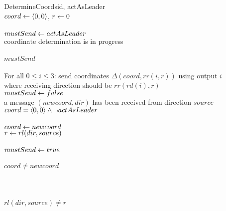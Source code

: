 \begin{myalgo}{DetermineCoords}{id, actAsLeader}
  \\
 $coord  \mathrel{\leftarrow} \langle 0,0 \rangle$, $r \mathrel{\leftarrow} 0$ \\
  \\
 $mustSend \mathrel{\leftarrow} actAsLeader$ \\
 \qwhile coordinate determination is in progress \label{sp2:loop} \\
 \qdo {} \\
       \qif $mustSend$ \label{sp2:send1} \\
       \qthen {} \\
              For all $0 \leq i \leq 3$: send coordinates $\Delta(coord, rr(i, r))$ using output $i$ \\
              where receiving direction should be $rr(rd(i), r)$ \\
              $mustSend \mathrel{\leftarrow} false$ \qfi \label{sp2:send2} \\
      \qif a message $(newcoord, dir)$ has been received from direction $source$ \\
      \qthen \qif $coord = \langle 0, 0 \rangle \land \lnot actAsLeader$ \label{sp2:isinitial} \\
             \qthen {} \label{sp2:recinit1} \\
                    $coord \mathrel{\leftarrow} newcoord$ \\
                    $r \mathrel{\leftarrow} rl(dir, source)$  \\
                     \\
                    $mustSend \mathrel{\leftarrow} true$ \qfi \label{sp2:recinit2} \\
             \qelse {} \\ \label{sp2:recnext1}
                    \qif $coord \neq newcoord$ \\
                    \qthen {} \\
                           \label{sp2:rejectcoord} \qreset \\
                    \qelse {} \\
                           \qif $rl(dir, source) \neq r$ \label{sp2:badrot} \\
                           \qthen {} \\
                                  \qreset \\
                           \qelse {} \\
                                  \qignore \qfi \qfi \qfi \qfi \qelihw \label{sp2:recnext2}
\end{myalgo}

